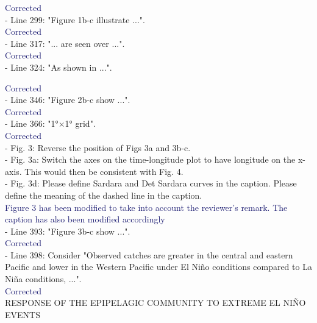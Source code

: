 \documentclass[12pt]{article}
\newcommand{\resp}[1]{\textcolor{MidnightBlue}{#1}}
\begin{document}
\resp{Corrected}\\

- Line 299: "Figure 1b-c illustrate ...".\\

\resp{Corrected}	\\

- Line 317: "... are seen over ...".\\

\resp{Corrected}\\

- Line 324: "As shown in ...".

\resp{Corrected}\\

- Line 346: "Figure 2b-c show ...".\\

\resp{Corrected}\\

- Line 366: "1°×1° grid".\\

\resp{Corrected} \\

- Fig. 3: Reverse the position of Figs 3a and 3b-c.\\

- Fig. 3a: Switch the axes on the time-longitude plot to have longitude on the x-axis. This would then be consistent with Fig. 4.\\

- Fig. 3d: Please define Sardara and Det Sardara curves in the caption. Please define the meaning of the dashed line in the caption.\\

\resp{Figure 3 has been modified to take into account the reviewer's remark. The caption has also been modified accordingly} \\

- Line 393: "Figure 3b-c show ...".\\

\resp{Corrected} \\

- Line 398: Consider "Observed catches are greater in the central and eastern Pacific and lower in the Western Pacific under El Niño conditions compared to La Niña conditions, ...".\\

\resp{Corrected} \\

RESPONSE OF THE EPIPELAGIC COMMUNITY TO EXTREME EL NIÑO EVENTS\\
\end{document}
